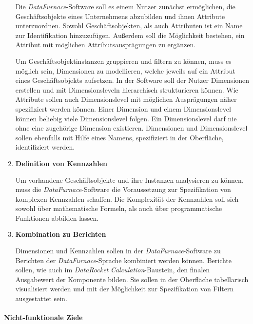\documentclass[
  language=german, %
  type=bachelor,%
  ngerman
]{isthesis}
\begin{document}
\begin{content}
\begin{enumerate}
      Die \textit{DataFurnace}-Software soll es einem Nutzer zunächst
      ermöglichen, die Geschäftsobjekte eines Unternehmens abzubilden und ihnen
      Attribute unterzuordnen. Sowohl Geschäftsobjekten, als auch Attributen
      ist ein Name zur Identifikation hinzuzufügen. Außerdem soll die
      Möglichkeit bestehen, ein Attribut mit möglichen Attributsausprägungen zu
      ergänzen.

      Um Geschäftsobjektinstanzen gruppieren und filtern zu können, muss es
      möglich sein, Dimensionen zu modellieren, welche jeweils auf ein Attribut
      eines Geschäftsobjekts aufsetzen. In der Software soll der Nutzer
      Dimensionen erstellen und mit Dimensionsleveln hierarchisch strukturieren
      können. Wie Attribute sollen auch Dimensionslevel mit möglichen
      Ausprägungen näher spezifiziert werden können. Einer Dimension und einem
      Dimensionslevel können beliebig viele Dimensionslevel folgen. Ein
      Dimensionslevel darf nie ohne eine zugehörige Dimension existieren.
      Dimensionen und Dimensionslevel sollen ebenfalls mit Hilfe eines Namens,
      spezifiziert in der Oberfläche, identifiziert werden.

    \item \textbf{Definition von Kennzahlen}

      Um vorhandene Geschäftsobjekte und ihre Instanzen analysieren zu können,
      muss die \textit{DataFurnace}-Software die Voraussetzung zur
      Spezifikation von komplexen Kennzahlen schaffen. Die Komplexität der
      Kennzahlen soll sich sowohl über mathematische Formeln, als auch
      über programmatische Funktionen abbilden lassen.

    \item \textbf{Kombination zu Berichten}

      Dimensionen und Kennzahlen sollen in der \textit{DataFurnace}-Software zu
      Berichten der \textit{DataFurnace}-Sprache kombiniert werden können.
      Berichte sollen, wie auch im \textit{DataRocket}
      \textit{Calculation}-Baustein, den finalen Ausgabewert der Komponente
      bilden. Sie sollen in der Oberfläche tabellarisch visualisiert werden und
      mit der Möglichkeit zur Spezifikation von Filtern ausgestattet sein.

  \end{enumerate}

  \paragraph{Nicht-funktionale Ziele}
  \begin{enumerate}


\end{enumerate}
\end{content}
\end{document}
